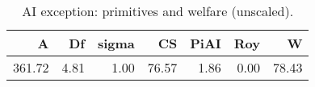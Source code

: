 \begin{table}[!ht]
\centering
\caption{AI exception: primitives and welfare (unscaled).}
\label{tab:exception}
\begin{tabular}{rrrrrrr}
\toprule
A & Df & sigma & CS & PiAI & Roy & W \\
\midrule
361.72 & 4.81 & 1.00 & 76.57 & 1.86 & 0.00 & 78.43 \\
\bottomrule
\end{tabular}

\end{table}